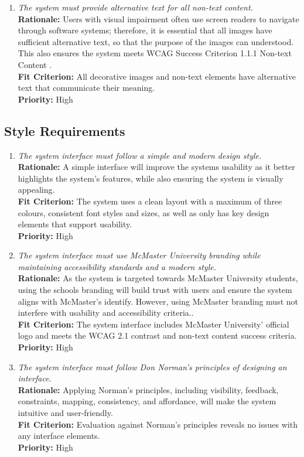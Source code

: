 \documentclass[12pt]{article}
\begin{document}
\begin{enumerate}[label=LFR-AR \arabic*., wide=0pt, leftmargin=*]
  \item \emph{The system must provide alternative text for all
    non-text content.}\\[2mm]
    {\bf Rationale:} Users with visual impairment often use screen
    readers to navigate through software systems; therefore, it is
    essential that all images have sufficient alternative text, so
    that the purpose of the images can understood. This also ensures
    the system meets WCAG Success Criterion 1.1.1 Non-text Content  .\\
    {\bf Fit Criterion:} All decorative images and non-text elements
    have alternative text that communicate their meaning. \\
    {\bf Priority:} High
\end{enumerate}

\subsection{Style Requirements}
\begin{enumerate}[label=LFR-SR \arabic*., wide=0pt, leftmargin=*]
  \item \emph{The system interface must follow a simple and modern
    design style.}\\[2mm]
    {\bf Rationale:} A simple interface will improve the systems
    usability as it better highlights the system's features, while
    also ensuring the system is visually appealing.\\
    {\bf Fit Criterion:} The system uses a clean layout with a
    maximum of three colours, consistent font styles and sizes, as
    well as only has key design elements that support usability. \\
    {\bf Priority:} High
\item \emph{The system interface must use McMaster University branding while maintaining accessibility standards and a modern style.}\\[2mm] 
    {\bf Rationale:} As the system is targeted towards McMaster University students, using the schools branding will build trust with users and ensure the system aligns with McMaster's identify. However, using McMaster branding must not interfere with usability and accessibility criteria..\\
    {\bf Fit Criterion:} The system interface includes McMaster University' official logo and meets the WCAG 2.1 contrast and non-text content success criteria. \\
    {\bf Priority:} High
\item \emph{The system interface must follow Don Norman's principles of designing an interface.}\\[2mm] 
    {\bf Rationale:} Applying Norman's principles, including visibility, feedback, constraints, mapping, consistency, and affordance, will make the system intuitive and user-friendly.\\
    {\bf Fit Criterion:} Evaluation against Norman's principles reveals no issues with any interface elements.\\
    {\bf Priority:} High
\end{enumerate}
\end{document}
